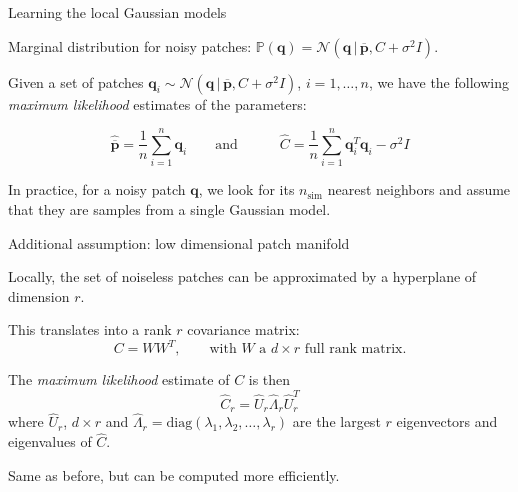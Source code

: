 \documentclass[mathserif, 8pt]{beamer}
\newcommand{\ma}[1]{\boldsymbol{#1}}
\begin{document}
\begin{frame}{Learning the local Gaussian models}

	Marginal distribution for noisy patches:
	$\mathds{P}(\ma q) = \mathcal{N}(\ma q \,|\,\overline{\ma p}, C + \sigma^2I).$

	\bigskip

	\bigskip

	\bigskip

	Given a set of patches $\ma q_i \sim \mathcal{N}(\ma q \,|\,\overline{\ma
	p}, C + \sigma^2I)$, $i = 1,\dots,n$, we have the following \emph{maximum likelihood} estimates
	of the parameters:

	\begin{equation*}
		\widehat{\overline{\ma p}} = \frac1n\sum_{i = 1}^n \ma q_i
		\quad\quad\text{and}\quad\quad\quad
		\widehat{C} = \frac1n\sum_{i = 1}^n \ma q_i^T\ma q_i - \sigma^2 I
	\end{equation*}

	\bigskip

	\bigskip

	\bigskip

	In practice, for a noisy patch $\ma q$, we look for its $n_{\text{sim}}$
	nearest neighbors and assume that they are samples from a single Gaussian
	model. 

\end{frame}

\begin{frame}{Additional assumption: low dimensional patch manifold}

	 Locally, the set of noiseless patches
	can be approximated by a hyperplane of dimension $r$.

	\bigskip

	 This translates into a rank $r$
	covariance matrix: \[C = WW^T, \quad\quad\text{with }W \text{ a }d\times r \text{ full rank matrix}.\] 

	\bigskip

	 The \emph{maximum likelihood} estimate of $C$ is then 
	\[\widehat{C}_r = \widehat{U}_r\widehat{\Lambda}_r\widehat{U}^T_r\]
	where $\widehat{U}_r$, $d\times r$ and $\widehat{\Lambda}_r =
	\text{diag}(\lambda_1, \lambda_2,\dots,\lambda_r)$ are the largest 
	$r$ eigenvectors and eigenvalues of $\widehat{C}$.

	\bigskip

	 Same as before, but can be computed more
	efficiently.


\end{frame}
\end{document}
